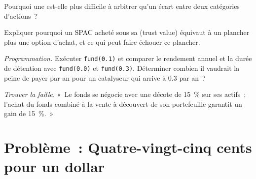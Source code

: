 \begin{exercise}[$\star\star$]\label{exo:s1:share-classes-holding-companies-closed-end-funds-spacs:5}
Pourquoi une  est-elle plus difficile à arbitrer qu'un écart entre deux catégories d'actions~?
\end{exercise}

\begin{exercise}[$\star\star$]\label{exo:s1:share-classes-holding-companies-closed-end-funds-spacs:6}
Expliquer pourquoi un SPAC acheté sous sa  (trust value) équivaut à un plancher plus une option d'achat, et ce qui peut faire échouer ce plancher.
\end{exercise}

\begin{exercise}[$\star\star\star$]\label{exo:s1:share-classes-holding-companies-closed-end-funds-spacs:7}
\emph{Programmation.} Exécuter \texttt{fund(0.1)} et comparer le rendement annuel et la durée de détention avec \texttt{fund(0.0)} et \texttt{fund(0.3)}. Déterminer combien il vaudrait la
peine de payer par an pour un catalyseur qui arrive à 0.3 par an~?
\end{exercise}

\begin{exercise}[$\star\star\star$]\label{exo:s1:share-classes-holding-companies-closed-end-funds-spacs:8}
\emph{Trouver la faille.} «~Le fonds se négocie avec une décote de 15~\% sur ses actifs~; l'achat du fonds combiné à la vente à découvert de son portefeuille garantit un gain de 15~\%.~»
\end{exercise}

\section{Problème~: Quatre-vingt-cinq cents pour un dollar}

